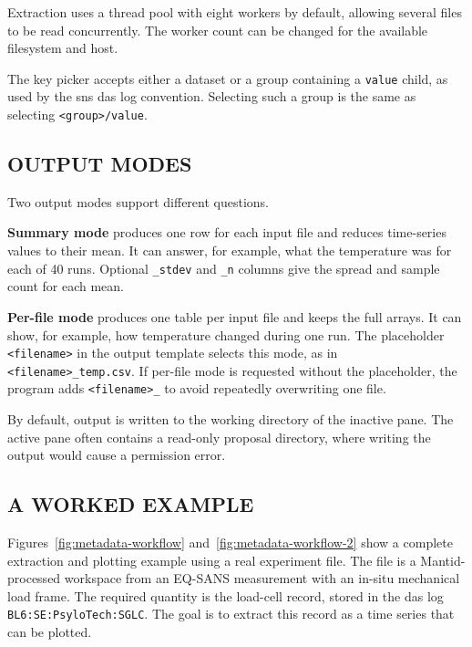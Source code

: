 \documentclass[tm]{ornltm}
\begin{document}
Extraction uses a thread pool with eight workers by default, allowing several
files to be read concurrently. The worker count can be changed for the available
filesystem and host.

The key picker accepts either a dataset or a group containing a \texttt{value}
child, as used by the \ac{sns} \ac{das} log convention. Selecting such a group
is the same as selecting \texttt{<group>/value}.

\subsection{OUTPUT MODES}

Two output modes support different questions.

\textbf{Summary mode} produces one row for each input file and reduces
time-series values to their mean. It can answer, for example, what the
temperature was for each of 40 runs. Optional \texttt{\_stdev} and \texttt{\_n}
columns give the spread and sample count for each mean.

\textbf{Per-file mode} produces one table per input file and keeps the full
arrays. It can show, for example, how temperature changed during one run. The
placeholder \texttt{<filename>} in the output template selects this mode, as in
\texttt{<filename>\_temp.csv}. If per-file mode is requested without the
placeholder, the program adds \texttt{<filename>\_} to avoid repeatedly
overwriting one file.

By default, output is written to the working directory of the inactive pane.
The active pane often contains a read-only proposal directory, where writing the
output would cause a permission error.

\subsection{A WORKED EXAMPLE}
\label{sec:metadata-example}

Figures~\ref{fig:metadata-workflow} and~\ref{fig:metadata-workflow-2} show a
complete extraction and plotting example using a real experiment file. The file
is a Mantid-processed workspace from an EQ-SANS measurement with an in-situ
mechanical load frame. The required quantity is the load-cell record, stored in
the \ac{das} log \texttt{BL6:SE:PsyloTech:SGLC}. The goal is to extract this
record as a time series that can be plotted.
\end{document}
